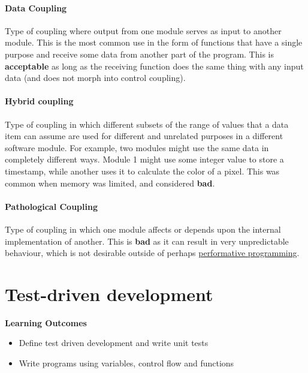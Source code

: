 \paragraph{Data Coupling} %
\label{par:data_coupling}
Type of coupling where output from one module serves as input to another module.
This is the most common use in the form of functions that have a single purpose and receive some data from another part of the program. This is \textbf{acceptable} as long as the receiving function does the same thing with any input data (and does not morph into control coupling).

\paragraph{Hybrid coupling} %
\label{par:hybrid_coupling}
Type of coupling in which different subsets of the range of values that a data item can assume are used for different and unrelated purposes in a different software module. For example, two modules might use the same data in completely different ways. Module 1 might use some integer value to store a timestamp, while another uses it to calculate the color of a pixel. This was common when memory was limited, and considered \textbf{bad}.

\paragraph{Pathological Coupling} %
\label{par:pathological_coupling}
Type of coupling in which one module affects or depends upon the internal implementation of another. This is \textbf{bad} as it can result in very unpredictable behaviour, which is not desirable outside of perhaps \href{https://www.youtube.com/watch?v=H5IceNlC69w}{performative programming}.

\section{Test-driven development}
\begin{mdframed}
\textbf{Learning Outcomes}
\begin{itemize}[label={\checkmark}]
\item Define test driven development and write unit tests
\item Write programs using variables, control flow and functions
\end{itemize}
\end{mdframed}

